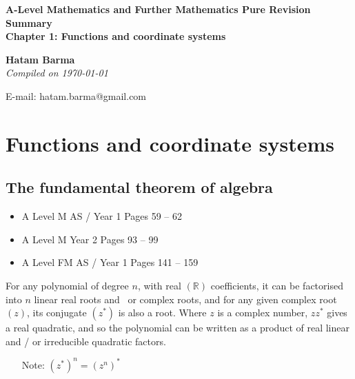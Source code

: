 \documentclass[11pt, a4paper]{article}
\begin{document}
\begin{titlepage}
   \begin{center}
       \vspace*{2.5cm}
	\huge
       \textbf{A-Level Mathematics and Further Mathematics Pure Revision Summary} \\
	\vspace{1cm}
	\Large
       \textbf{Chapter 1: Functions and coordinate systems}
            
       \vspace{1.5cm}
	\LARGE
       \textbf{Hatam Barma} \\
	\vspace{0.75cm}
       \normalsize
       \emph{Compiled on \Datea\today} \\

       \vfill
        

	E-mail: hatam.barma@gmail.com
   \end{center}
\end{titlepage}


\tableofcontents

\clearpage
\section{Functions and coordinate systems}
\vspace{0.5cm}

\subsection{The fundamental theorem of algebra}
\label{fundtheory}
\begin{itemize}
\item A Level M AS / Year 1 \hspace{1cm} \phantom{ } Pages 59 -- 62
\item A Level M Year 2 \hspace{1cm} \phantom{ AS / } Pages 93 -- 99
\item A Level FM AS / Year 1 \hspace{1cm} Pages 141 -- 159
\end{itemize} \par
For any polynomial of degree $n$, with real $(\mathbb{R})$ coefficients, it can be factorised into $n$ linear real roots and \ or complex roots, and for any given complex root $(z)$, its conjugate $(z^{*})$ is also a root. Where $z$ is a complex number, $zz^{*}$ gives a real quadratic, and so the polynomial can be written as a product of real linear and / or irreducible quadratic factors.
\begin{itemize}
\item[Note:] $\left( z^{*} \right)^{n} = \left( z^{n} \right)^{*}$
\end{itemize}
\vspace{0.5cm}
\end{document}
